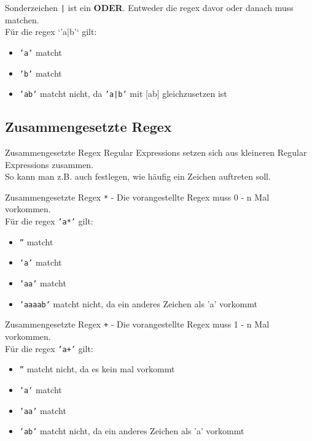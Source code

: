 \begin{frame}{Sonderzeichen}
	\texttt{|} ist ein \textbf{ODER}. Entweder die regex davor oder danach muss matchen.\\[.25cm]
	Für die regex `'a|b'` gilt:\\
	\begin{itemize}
		\item \texttt{'a'} matcht
		\item \texttt{'b'} matcht
		\item \texttt{'ab'} matcht nicht, da \texttt{'a|b'} mit [ab] gleichzusetzen ist
	\end{itemize}
\end{frame}

\subsection{Zusammengesetzte Regex}
\begin{frame}{Zusammengesetzte Regex}
	Regular Expressions setzen sich aus kleineren Regular Expressions zusammen.\\
	So kann man z.B. auch festlegen, wie häufig ein Zeichen auftreten soll.
\end{frame}

\begin{frame}{Zusammengesetzte Regex}
	\texttt{*} - Die \alert{vorangestellte} Regex muss 0 - n Mal vorkommen.\\[.25cm]
	Für die regex \texttt{'a*'} gilt:\\
	\begin{itemize}
		\item \texttt{''} matcht
		\item \texttt{'a'} matcht
		\item \texttt{'aa'} matcht
		\item \texttt{'aaaab'} matcht nicht, da ein anderes Zeichen als 'a' vorkommt
	\end{itemize}
\end{frame}

\begin{frame}{Zusammengesetzte Regex}
	\texttt{+} - Die \alert{vorangestellte} Regex muss 1 - n Mal vorkommen.\\[.25cm]
	Für die regex \texttt{'a+'} gilt:\\
	\begin{itemize}
		\item \texttt{''} matcht nicht, da es kein mal vorkommt
		\item \texttt{'a'} matcht
		\item \texttt{'aa'} matcht
		\item \texttt{'ab'} matcht nicht, da ein anderes Zeichen als 'a' vorkommt
	\end{itemize}
\end{frame}

